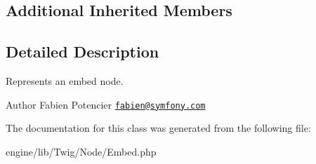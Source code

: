 \subsection*{Additional Inherited Members}


\subsection{Detailed Description}
Represents an embed node.

\begin{DoxyAuthor}{Author}
Fabien Potencier \href{mailto:fabien@symfony.com}{\tt fabien@symfony.\+com} 
\end{DoxyAuthor}


The documentation for this class was generated from the following file\+:\begin{DoxyCompactItemize}
\item 
engine/lib/\+Twig/\+Node/Embed.\+php\end{DoxyCompactItemize}
